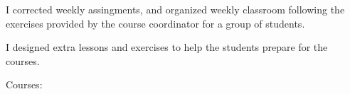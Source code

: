 I corrected weekly assingments, and organized weekly classroom following the
exercises provided by the course coordinator for a group of students.

\medskip

I designed extra lessons and exercises to help the students prepare for the
courses.

\medskip

Courses:
 

